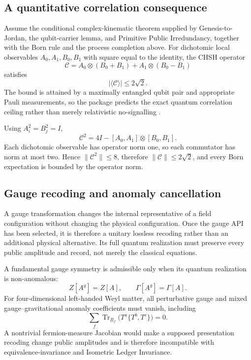 \subsection{A quantitative correlation consequence}

\begin{theorem}
\label{thm:tsirelson-closure}
Assume the conditional complex-kinematic theorem supplied by
Genesis-to-Jordan, the qubit-carrier lemma, and Primitive Public Irredundancy,
together with the Born rule and the process completion above.  For dichotomic local
observables \(A_0,A_1,B_0,B_1\) with square equal to the identity, the CHSH
operator
\[
 \mathcal C
 =A_0\otimes(B_0+B_1)
  +A_1\otimes(B_0-B_1)
\]
satisfies
\[
 \boxed{|\langle\mathcal C\rangle|\le2\sqrt2.}
\]
The bound is attained by a maximally entangled qubit pair and appropriate Pauli
measurements, so the package predicts the exact quantum correlation ceiling rather
than merely relativistic no-signalling \cite{tsirelson}.
\end{theorem}

\begin{proofsketch}
Using \(A_i^2=B_j^2=I\),
\[
 \mathcal C^2
 =4I-[A_0,A_1]\otimes[B_0,B_1].
\]
Each dichotomic observable has operator norm one, so each commutator has norm at
most two.  Hence \(\|\mathcal C^2\|\le8\), therefore
\(\|\mathcal C\|\le2\sqrt2\), and every Born expectation is bounded by the
operator norm.
\end{proofsketch}


\subsection{Gauge recoding and anomaly cancellation}

\begin{principle}
A gauge transformation changes the internal representative of a field configuration
without changing the physical configuration.  Once the gauge API has been selected,
it is therefore a unitary lossless recoding rather than an additional physical
alternative.  Its full quantum realization must preserve every public amplitude and
record, not merely the classical equations.
\end{principle}

\begin{theorem}
\label{thm:gauge-anomaly-exclusion-ledger}
A fundamental gauge symmetry is admissible only when its quantum realization is
non-anomalous:
\[
 Z[A^g]=Z[A],
 \qquad
 \Gamma[A^g]=\Gamma[A].
\]
For four-dimensional left-handed Weyl matter, all perturbative gauge and mixed
gauge--gravitational anomaly coefficients must vanish, including
\[
 \sum_f
 \operatorname{Tr}_{R_f}
 \bigl(T^a\{T^b,T^c\}\bigr)=0.
\]
A nontrivial fermion-measure Jacobian would make a supposed presentation recoding
change public amplitudes and is therefore incompatible with equivalence-invariance
and Isometric Ledger Invariance.
\end{theorem}

